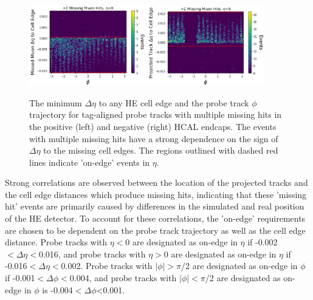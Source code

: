 \begin{figure}[htpb]
    \includegraphics[width=0.45\textwidth]{figures/posEtaEdgeEventsData.png} 
    \hspace{0.01\textwidth}
    \includegraphics[width=0.45\textwidth]{figures/negEtaEdgeEventsData.png}
    \centering
	\caption[$\eta$ edge correlations in missing HCAL muon hits.]{The minimum $\Delta\eta$ to any HE cell edge and the probe track $\phi$ trajectory for tag-aligned probe tracks with multiple missing hits in the positive (left) and negative (right) HCAL endcaps. The events with multiple missing hits have a strong dependence on the sign of $\Delta\eta$ to the missing cell edges. The regions outlined with dashed red lines indicate 'on-edge' events in $\eta$.}
    \label{fig:etaEdgeCorr}
\end{figure}

Strong correlations are observed between the location of the projected tracks and the cell edge distances which produce missing hits, indicating that these 'missing hit' events are primarily caused by differences in the simulated and real position of the HE detector.
To account for these correlations, the 'on-edge' requirements are chosen to be dependent on the probe track trajectory as well as the cell edge distance. 
Probe tracks with $\eta<$0 are designated as on-edge in $\eta$ if -0.002$<\Delta\eta<$0.016, and probe tracks with $\eta>$0 are designated as on-edge in $\eta$ if -0.016$<\Delta\eta<$0.002.
Probe tracks with $|\phi|>\pi$/2 are designated as on-edge in $\phi$ if -0.001$<\Delta\phi<$0.004, and probe tracks with $|\phi|<\pi$/2 are designated as on-edge in $\phi$ is -0.004$<\Delta\phi$<0.001.

